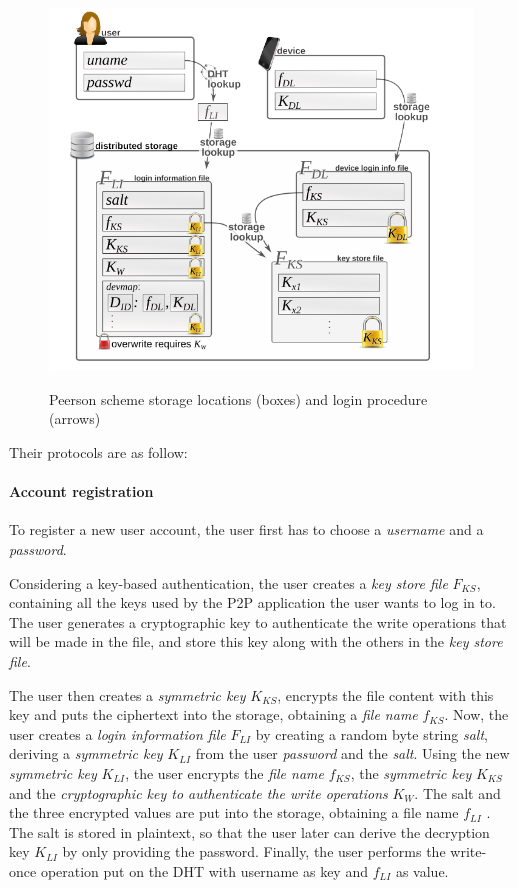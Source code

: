 \begin{figure}
\center
\includegraphics[width=12cm]{../img/password_peerson}\\
\caption{Peerson scheme storage locations (boxes) and login procedure (arrows) }
\label{fig:p2p_peerson}
\end{figure}

Their protocols are as follow:
%
\paragraph{Account registration}
To register a new user account, the user first
has to choose a \textit{username} and a \textit{password}.

Considering a key-based authentication, the user creates a \textit{key store
file} $F_{KS}$, containing all the
keys used by the P2P application the user wants to log in to.
The user generates a cryptographic key to authenticate the write operations
that will be made in the file, and store this key along with the others in the
\textit{key store file}.

The user then creates a \textit{symmetric key} $K_{KS}$,
encrypts the file content with this key and puts the ciphertext
into the storage, obtaining a \textit{file name} $f_{KS}$. Now, the user
creates a \textit{login information file} $F_{LI}$ by creating a random
byte string \textit{salt}, deriving a \textit{symmetric key} $K_{LI}$ from the user
\textit{password} and the \textit{salt}.
Using the new \textit{ symmetric key} $K_{LI}$, the user encrypts the
\textit{file name} $f_{KS}$,
the \textit{symmetric key} $K_{KS}$ and the \textit{cryptographic key to
authenticate the write operations} $K_W$.
 The salt and the three encrypted values are put
into the storage, obtaining a file name $f_{LI}$ . The salt is stored
in plaintext, so that the user later can derive the decryption
key $K_{LI}$ by only providing the password. Finally, the user
performs the write-once operation put on the DHT with
username as key and $f_{LI}$ as value.

